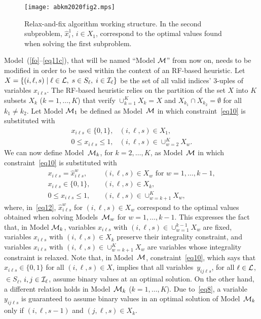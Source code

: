 \documentclass[11pt]{article}
\begin{document}
\begin{figure}[!ht]
\centering
\texttt{[image: abkm2020fig2.mps]}
\caption{Relax-and-fix algorithm working structure. In the second subproblem, $\hat x_i^1$, $i \in X_1$, correspond to the optimal values found when solving the first subproblem.}
\label{fig2}
\end{figure}

Model~(\ref{fo}--\ref{eq11c}), that will be named ``Model ${\cal M}$'' from now on, needs to be modified in order to be used within the context of an RF-based heuristic. Let $X=\{ (i,\ell,s) \; | \; \ell \in {\cal L}, \; s \in S_{\ell}, \; i \in {\cal I}_{\ell} \}$ be the set of all valid indices' $3$-uples of variables $x_{i \ell s}$. The RF-based heuristic relies on the partition of the set $X$ into $K$ subsets $X_k$ ($k=1,\dots,K$) that verify $\cup_{k=1}^K X_k = X$ and $X_{k_1} \cap X_{k_2} = \emptyset$ for all $k_1 \neq k_2$. Let Model ${\cal M}_1$ be defined as Model~${\cal M}$ in which constraint~\eqref{eq10} is substituted with
\begin{equation}
\begin{array}{rl}
x_{i \ell s} \in \{0,1\}, & (i, \ell, s) \in X_1,\\[2mm]
0 \leq x_{i\ell s} \leq 1, & (i,\ell, s) \in \cup_{w=2}^K X_w.
\end{array}
\end{equation}
We can now define Model~${\cal M}_k$, for $k=2,\dots,K$, as Model~${\cal M}$ in which constraint~\eqref{eq10} is substituted with
\begin{align}
x_{i \ell s} = \hat x_{i \ell s}^w, & \quad (i, \ell, s) \in X_w \mbox{ for } w=1,\dots,k-1, \label{eq12} \\
x_{i \ell s} \in \{0,1\}, & \quad (i, \ell, s) \in X_k, \label{eq13} \\
0 \leq x_{i\ell s} \leq 1, & \quad (i,\ell, s) \in \cup_{w=k+1}^K X_w, \label{eq14}
\end{align}
where, in~\eqref{eq12}, $\hat x_{i \ell s}^w$ for $(i, \ell, s) \in X_w$ correspond to the optimal values obtained when solving Models~${\cal M}_w$ for $w=1,\dots,k-1$. This expresses the fact that, in Model ${\cal M}_k$, variables $x_{i \ell s}$ with $(i, \ell, s) \in \cup_{w=1}^{k-1} X_w$ are fixed, variables $x_{i \ell s}$ with $(i, \ell, s) \in X_k$ preserve their integrality constraint, and variables $x_{i \ell s}$ with $(i, \ell, s) \in \cup_{w=k+1}^{K} X_w$ are variables whose integrality constraint is relaxed. Note that, in Model~${\cal M}$, constraint~\eqref{eq10}, which says that $x_{i \ell s} \in \{0,1\}$ for all $(i, \ell, s) \in X$, implies that all variables~$y_{i j \ell s}$, for all $\ell \in {\cal L}$, $\in S_{\ell}$, $i, j \in {\cal I}_{\ell}$, assume binary values at an optimal solution. On the other hand, a different relation holds in Model~${\cal M}_k$ ($k=1,\dots,K$). Due to~\eqref{eq8}, a variable $y_{i j \ell s}$ is guaranteed to assume binary values in an optimal solution of Model~${\cal M}_k$ only if $(i, \ell, s-1)$ and $(j, \ell, s) \in X_k$.
\end{document}
